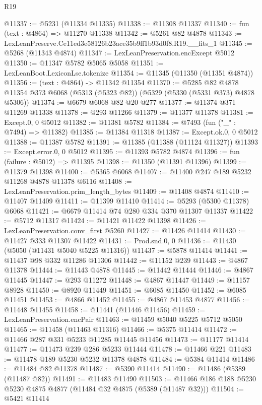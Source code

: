 \begin{lexlean}{R19}
\begin{coremodule}
@11337 := @5231 (@11334 @11335)
@11338 := @11308 @11337
@11340 := fun (text : @4864) => @11270 @11338
@11342 := @5261 @82 @4878
@11343 := LexLeanPreserve.Ce11ed3e58126b23ace35b9ff1b93d0f8.R19.__fits_1
@11345 := @5268 (@11343 @4874)
@11347 := LexLeanPreservation.encExcept @5012
@11350 := @11347 @5782 @5065 @5058
@11351 := LexLeanBoot.LexiconLse.tokenize
@11354 := @11345 (@11350 (@11351 @4874))
@11356 := (text : @4864) -> @11342 @11354
@11370 := @5285
    @82
    @4878
    @11354
    @373
    @6068
    (@5313 (@5323 @82))
    (@5329 (@5330 (@5331 @373) @4878 @5306))
@11374 := @6679 @6068 @82 @20 @277
@11377 := @11374 @371 @11269 @11338
@11378 := @293 @11266
@11379 := @11377 @11378
@11381 := Except.{0, 0} @5012
@11382 := @11381 @5782
@11384 := @7493 (fun ("_" : @7494) => @11382)
@11385 := @11384 @11318
@11387 := Except.ok.{0, 0} @5012
@11388 := @11387 @5782
@11391 := @11385 (@11388 (@11124 @11327))
@11393 := Except.error.{0, 0} @5012
@11395 := @11393 @5782 @4874
@11396 := fun (failure : @5012) => @11395
@11398 := @11350 (@11391 @11396)
@11399 := @11379 @11398
@11400 := @5365 @6068
@11407 := @11400 @247 @189 @5232 @11268 @4878 @11378 @6116
@11408 := LexLeanPreservation.prim_length_bytes
@11409 := @11408 @4874
@11410 := @11407 @11409
@11411 := @11399 @11410
@11414 := @5293 (@5300 @11378) @6068
@11421 := @6679 @11414 @74 @280 @334 @370 @11307 @11337
@11422 := @5712 @11317
@11424 := @11421 @11422 @11398
@11426 := LexLeanPreservation.conv_first @5260
@11427 := @11426 @11414
@11430 := @11427 @333 @11307 @11422
@11431 := Prod.snd.{0, 0}
@11436 := @11430 (@5050 (@11431 @5040 @5225 @11316))
@11437 := @5878 @11414
@11441 := @11437 @98 @332 @11286 @11306
@11442 := @11152 @239
@11443 := @4867 @11378
@11444 := @11443 @4878
@11445 := @11442 @11444
@11446 := @4867 @11445
@11447 := @293 @11272
@11448 := @4867 @11447
@11449 := @11157 @8928
@11450 := @8920 @11449
@11451 := @6085 @11450
@11452 := @6085 @11451
@11453 := @4866 @11452
@11455 := @4867 @11453 @4877
@11456 := @11448 @11455
@11458 := @11441 (@11446 @11456)
@11459 := LexLeanPreservation.encPair
@11463 := @11459 @5040 @5225 @5712 @5050
@11465 := @11458 (@11463 @11316)
@11466 := @5375 @11414
@11472 := @11466 @287 @331 @5233 @11285 @11445 @11456
@11473 := @11177 @11414
@11477 := @11473 @239 @286 @5233 @11444
@11478 := @11466 @221
@11483 := @11478 @189 @5230 @5232 @11378 @4878
@11484 := @5384 @11414
@11486 := @11484 @82 @11378
@11487 := @5390 @11414
@11490 := @11486 (@5389 (@11487 @82))
@11491 := @11483 @11490
@11503 := @11466 @186 @188 @5230 @5230 @4875 @4877 (@11484 @32 @4875 (@5389 (@11487 @32)))
@11504 := @5421 @11414

\end{coremodule}
\end{lexlean}
